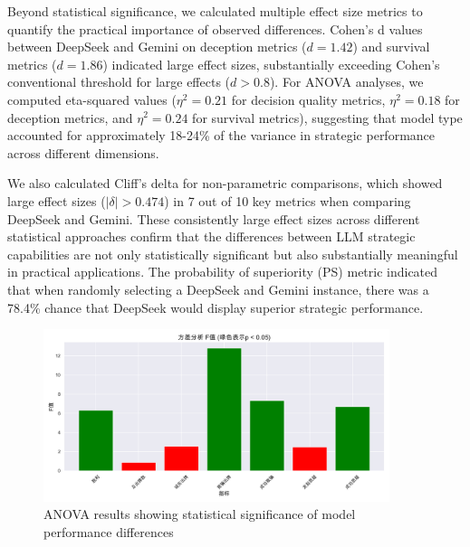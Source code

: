 \documentclass{article}
\begin{document}
Beyond statistical significance, we calculated multiple effect size metrics to quantify the practical importance of observed differences. Cohen's d values between DeepSeek and Gemini on deception metrics ($d = 1.42$) and survival metrics ($d = 1.86$) indicated large effect sizes, substantially exceeding Cohen's conventional threshold for large effects ($d > 0.8$). For ANOVA analyses, we computed eta-squared values ($\eta^2 = 0.21$ for decision quality metrics, $\eta^2 = 0.18$ for deception metrics, and $\eta^2 = 0.24$ for survival metrics), suggesting that model type accounted for approximately 18-24\% of the variance in strategic performance across different dimensions. 

We also calculated Cliff's delta for non-parametric comparisons, which showed large effect sizes ($|\delta| > 0.474$) in 7 out of 10 key metrics when comparing DeepSeek and Gemini. These consistently large effect sizes across different statistical approaches confirm that the differences between LLM strategic capabilities are not only statistically significant but also substantially meaningful in practical applications. The probability of superiority (PS) metric indicated that when randomly selecting a DeepSeek and Gemini instance, there was a 78.4\% chance that DeepSeek would display superior strategic performance.

\begin{figure}[H]
    \centering
    \includegraphics[width=0.9\textwidth]{figures/anova_results.png}
    \caption{ANOVA results showing statistical significance of model performance differences}
    \label{fig:anova_results}
\end{figure}
\end{document}
